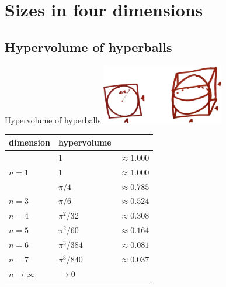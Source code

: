 \documentclass[12pt,compress,ngerman,utf8,t]{beamer}
\begin{document}
\section[Sizes]{Sizes in four dimensions}

\subsection{Hypervolume of hyperballs}

\begin{frame}{Hypervolume of hyperballs}
  \centering
  \includegraphics[width=0.4\textwidth]{sizes-1}
  \bigskip

  \small
  \begin{tabular}{lll}
    \toprule
    dimension & hypervolume & \\\midrule
    \only<2>{%
      $n = 0$ & $1$ & $\approx 1.000$ \\
      $n = 1$ & $1$ & $\approx 1.000$ \\
    }%
    $n = 2$ & $\pi / 4$ & $\approx 0.785$ \\
    $n = 3$ & $\pi / 6$ & $\approx 0.524$ \\
    $n = 4$ & $\pi^2 / 32$ & $\approx 0.308$ \\
    $n = 5$ & $\pi^2 / 60$ & $\approx 0.164$ \\
    $n = 6$ & $\pi^3 / 384$ & $\approx 0.081$ \\
    $n = 7$ & $\pi^3 / 840$ & $\approx 0.037$ \\
    $n \to \infty$ & $\to 0$ \\
    \bottomrule
  \end{tabular}\par
\end{frame}
\end{document}
